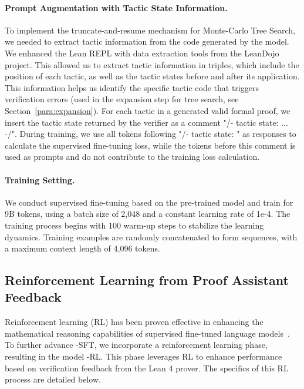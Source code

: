 \paragraph{Prompt Augmentation with Tactic State Information. } \label{sec:sft-tactic-state}
To implement the truncate-and-resume mechanism for Monte-Carlo Tree Search, we needed to extract tactic information from the code generated by the model. We enhanced the Lean REPL \citep[Read-Eval-Print Loop;][]{repl} with data extraction tools from the LeanDojo \citep{yang2024leandojo} project. This allowed us to extract tactic information in triples, which include the position of each tactic, as well as the tactic states before and after its application. This information helps us identify the specific tactic code that triggers verification errors (used in the expansion step for tree search, see Section~\ref{para:expansion}). For each tactic in a generated valid formal proof, we insert the tactic state returned by the verifier as a comment "/- tactic state: ... -/". During training, we use all tokens following "/- tactic state: " as responses to calculate the supervised fine-tuning loss, while the tokens before this comment is used as prompts and do not contribute to the training loss calculation.

\vspace{-0.1in}

\paragraph{Training Setting. }
We conduct supervised fine-tuning based on the pre-trained model and train for 9B tokens, using a batch size of 2,048 and a constant learning rate of 1e-4. The training process begins with 100 warm-up steps to stabilize the learning dynamics. Training examples are randomly concatenated to form sequences, with a maximum context length of 4,096 tokens.

\subsection{Reinforcement Learning from Proof Assistant Feedback}

Reinforcement learning (RL) has been proven effective in enhancing the mathematical reasoning capabilities of supervised fine-tuned language models~\citep{shao2024deepseekmath}. To further advance \thiswork-SFT, we incorporate a reinforcement learning phase, resulting in the model \thiswork-RL. This phase leverages RL to enhance performance based on verification feedback from the Lean 4 prover. The specifics of this RL process are detailed below.

